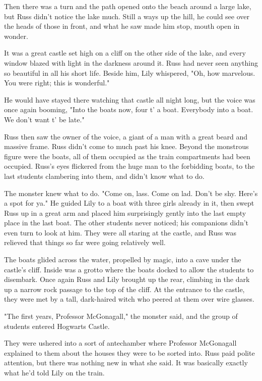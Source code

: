 \documentclass[a4paper,11pt]{article}
\begin{document}
Then there was a turn and the path opened onto the beach around a large lake, but Russ didn't notice the lake much. Still a ways up the hill, he could see over the heads of those in front, and what he saw made him stop, mouth open in wonder.

It was a great castle set high on a cliff on the other side of the lake, and every window blazed with light in the darkness around it. Russ had never seen anything so beautiful in all his short life. Beside him, Lily whispered, "Oh, how marvelous. You were right; this is wonderful."

He would have stayed there watching that castle all night long, but the voice was once again booming, "Into the boats now, four t' a boat. Everybody into a boat. We don't want t' be late."

Russ then saw the owner of the voice, a giant of a man with a great beard and massive frame. Russ didn't come to much past his knee. Beyond the monstrous figure were the boats, all of them occupied as the train compartments had been occupied. Russ's eyes flickered from the huge man to the forbidding boats, to the last students clambering into them, and didn't know what to do.

The monster knew what to do. "Come on, lass. Come on lad. Don't be shy. Here's a spot for ya." He guided Lily to a boat with three girls already in it, then swept Russ up in a great arm and placed him surprisingly gently into the last empty place in the last boat. The other students never noticed; his companions didn't even turn to look at him. They were all staring at the castle, and Russ was relieved that things so far were going relatively well.

The boats glided across the water, propelled by magic, into a cave under the castle's cliff. Inside was a grotto where the boats docked to allow the students to disembark. Once again Russ and Lily brought up the rear, climbing in the dark up a narrow rock passage to the top of the cliff. At the entrance to the castle, they were met by a tall, dark-haired witch who peered at them over wire glasses.

"The first years, Professor McGonagall," the monster said, and the group of students entered Hogwarts Castle.

They were ushered into a sort of antechamber where Professor McGonagall explained to them about the houses they were to be sorted into. Russ paid polite attention, but there was nothing new in what she said. It was basically exactly what he'd told Lily on the train.
\end{document}
